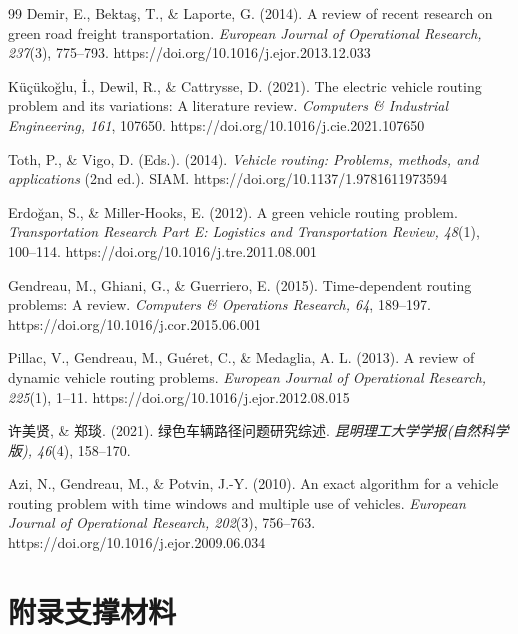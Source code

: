 \documentclass[12pt,a4paper]{article}
\newcommand{\appendixtocsub}[1]{\addcontentsline{toc}{subsection}{\protect\numberline{}#1}}
\newcommand{\appentry}[2]{附录\makebox[1.5em][l]{#1}#2}
\begin{document}
\begin{thebibliography}{99}
 Demir, E., Bekta\c{s}, T., \& Laporte, G. (2014). A review of recent research on green road freight transportation. \textit{European Journal of Operational Research, 237}(3), 775--793. https://doi.org/10.1016/j.ejor.2013.12.033

 K\"u\c{c}\"uko\u{g}lu, \.I., Dewil, R., \& Cattrysse, D. (2021). The electric vehicle routing problem and its variations: A literature review. \textit{Computers \& Industrial Engineering, 161}, 107650. https://doi.org/10.1016/j.cie.2021.107650

 Toth, P., \& Vigo, D. (Eds.). (2014). \textit{Vehicle routing: Problems, methods, and applications} (2nd ed.). SIAM. https://doi.org/10.1137/1.9781611973594

 Erdo\u{g}an, S., \& Miller-Hooks, E. (2012). A green vehicle routing problem. \textit{Transportation Research Part E: Logistics and Transportation Review, 48}(1), 100--114. https://doi.org/10.1016/j.tre.2011.08.001

 Gendreau, M., Ghiani, G., \& Guerriero, E. (2015). Time-dependent routing problems: A review. \textit{Computers \& Operations Research, 64}, 189--197. https://doi.org/10.1016/j.cor.2015.06.001

 Pillac, V., Gendreau, M., Gu\'eret, C., \& Medaglia, A. L. (2013). A review of dynamic vehicle routing problems. \textit{European Journal of Operational Research, 225}(1), 1--11. https://doi.org/10.1016/j.ejor.2012.08.015

 许美贤, \& 郑琰. (2021). 绿色车辆路径问题研究综述. \textit{昆明理工大学学报(自然科学版), 46}(4), 158--170.

 Azi, N., Gendreau, M., \& Potvin, J.-Y. (2010). An exact algorithm for a vehicle routing problem with time windows and multiple use of vehicles. \textit{European Journal of Operational Research, 202}(3), 756--763. https://doi.org/10.1016/j.ejor.2009.06.034

\end{thebibliography}
\newpage






{}


\appendixtocsub{\appentry{A}{支撑材料}}
\section*{\appentry{A}{支撑材料}}
\end{document}
